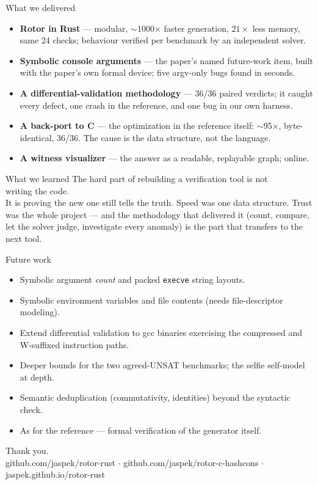 \documentclass[aspectratio=169]{beamer}
\newcommand{\lab}[1]{{\footnotesize\color{ink!65}#1}}
\newcommand{\key}[1]{\textbf{\color{accentdk}#1}}
\begin{document}
\begin{frame}{What we delivered}
  \begin{itemize}\setlength\itemsep{0.4em}\footnotesize
    \item \key{Rotor in Rust} --- modular, $\sim$1000$\times$ faster
          generation, $21\times$ less memory, same 24 checks; behaviour
          verified per benchmark by an independent solver.
    \item \key{Symbolic console arguments} --- the paper's named future-work
          item, built with the paper's own formal device; five argv-only bugs
          found in seconds.
    \item \key{A differential-validation methodology} --- 36/36 paired
          verdicts; it caught every defect, one crash in the reference, and
          one bug in our own harness.
    \item \key{A back-port to C} --- the optimization in the reference itself:
          $\sim$95$\times$, byte-identical, 36/36. The cause is the data
          structure, not the language.
    \item \key{A witness visualizer} --- the answer as a readable, replayable
          graph; online.
  \end{itemize}
\end{frame}

\begin{frame}{What we learned}
  \vfill
  \centering
  {\large The hard part of rebuilding a verification tool is not\\
   writing the code.}\\[0.6em]
  {\large It is \alert{proving the new one still tells the truth}.}
  \vfill
  \lab{Speed was one data structure. Trust was the whole project --- and the
       methodology that delivered it (count, compare, let the solver judge,
       investigate every anomaly) is the part that transfers to the next
       tool.}
  \vfill
\end{frame}

\begin{frame}{Future work}
  \begin{itemize}\setlength\itemsep{0.35em}\footnotesize
    \item Symbolic argument \emph{count} and packed \texttt{execve} string
          layouts.
    \item Symbolic environment variables and file contents (needs
          file-descriptor modeling).
    \item Extend differential validation to gcc binaries exercising the
          compressed and W-suffixed instruction paths.
    \item Deeper bounds for the two agreed-UNSAT benchmarks; the selfie
          self-model at depth.
    \item Semantic deduplication (commutativity, identities) beyond the
          syntactic check.
    \item As for the reference --- formal verification of the generator
          itself.
  \end{itemize}
\end{frame}

\begin{frame}[standout]
  Thank you.\\[0.6em]
  {\small github.com/jaspek/rotor-rust \;$\cdot$\;
   github.com/jaspek/rotor-c-hashcons \;$\cdot$\;
   jaspek.github.io/rotor-rust}
\end{frame}
\end{document}
